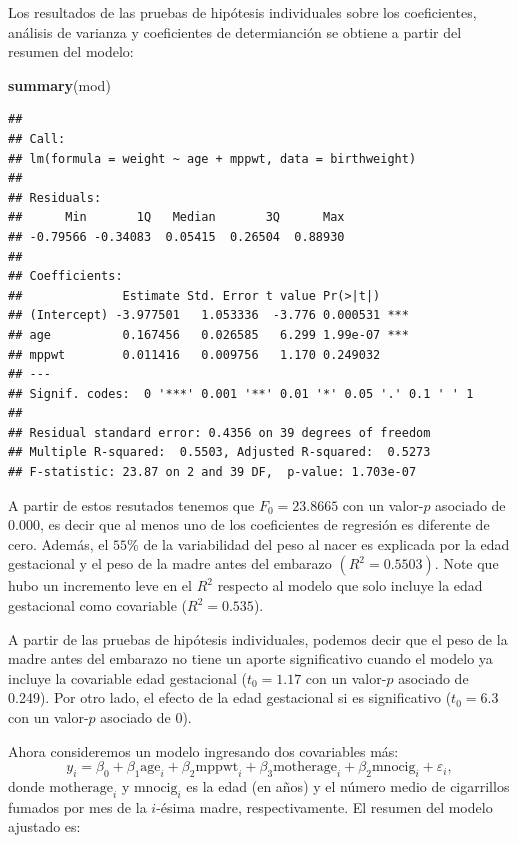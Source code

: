 \documentclass[
]{article}
\newenvironment{Shaded}{\begin{snugshade}}{\end{snugshade}}
\newcommand{\FunctionTok}[1]{\textcolor[rgb]{0.13,0.29,0.53}{\textbf{#1}}}
\newcommand{\NormalTok}[1]{#1}
\begin{document}
Los resultados de las pruebas de hipótesis individuales sobre los coeficientes, análisis de varianza y coeficientes de determianción se obtiene a partir del resumen del modelo:

\begin{Shaded}
\begin{Highlighting}[]
\FunctionTok{summary}\NormalTok{(mod)}
\end{Highlighting}
\end{Shaded}

\begin{verbatim}
## 
## Call:
## lm(formula = weight ~ age + mppwt, data = birthweight)
## 
## Residuals:
##      Min       1Q   Median       3Q      Max 
## -0.79566 -0.34083  0.05415  0.26504  0.88930 
## 
## Coefficients:
##              Estimate Std. Error t value Pr(>|t|)    
## (Intercept) -3.977501   1.053336  -3.776 0.000531 ***
## age          0.167456   0.026585   6.299 1.99e-07 ***
## mppwt        0.011416   0.009756   1.170 0.249032    
## ---
## Signif. codes:  0 '***' 0.001 '**' 0.01 '*' 0.05 '.' 0.1 ' ' 1
## 
## Residual standard error: 0.4356 on 39 degrees of freedom
## Multiple R-squared:  0.5503, Adjusted R-squared:  0.5273 
## F-statistic: 23.87 on 2 and 39 DF,  p-value: 1.703e-07
\end{verbatim}

A partir de estos resutados tenemos que \(F_{0}=23.8665\) con un valor-\(p\) asociado de \(0.000\), es decir que al menos uno de los coeficientes de regresión es diferente de cero. Además, el \(55\)\% de la variabilidad del peso al nacer es explicada por la edad gestacional y el peso de la madre antes del embarazo \((R^{2}=0.5503)\). Note que hubo un incremento leve en el \(R^{2}\) respecto al modelo que solo incluye la edad gestacional como covariable (\(R^{2} = 0.535\)).

A partir de las pruebas de hipótesis individuales, podemos decir que el peso de la madre antes del embarazo no tiene un aporte significativo cuando el modelo ya incluye la covariable edad gestacional (\(t_{0}=1.17\) con un valor-\(p\) asociado de 0.249). Por otro lado, el efecto de la edad gestacional si es significativo (\(t_{0}=6.3\) con un valor-\(p\) asociado de 0).

Ahora consideremos un modelo ingresando dos covariables más:
\[
y_{i} = \beta_{0} + \beta_{1}\mbox{age}_{i} + \beta_{2}\mbox{mppwt}_{i} + \beta_{3}\mbox{motherage}_{i} + \beta_{2}\mbox{mnocig}_{i} + \varepsilon_{i},
\]
donde \(\mbox{motherage}_{i}\) y \(\mbox{mnocig}_{i}\) es la edad (en años) y el número medio de cigarrillos fumados por mes de la \(i\)-ésima madre, respectivamente. El resumen del modelo ajustado es:
\end{document}
